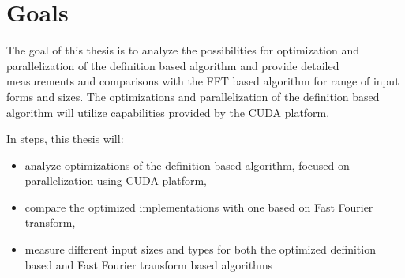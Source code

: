 \section*{Goals}
The goal of this thesis is to analyze the possibilities for optimization and parallelization of the definition based algorithm and provide detailed measurements and comparisons with the FFT based algorithm for range of input forms and sizes. The optimizations and parallelization of the definition based algorithm will utilize capabilities provided by the CUDA platform.

In steps, this thesis will:
\begin{itemize}
	\item analyze optimizations of the definition based algorithm, focused on parallelization using CUDA platform,
	\item compare the optimized implementations with one based on Fast Fourier transform,
	\item measure different input sizes and types for both the optimized definition based and Fast Fourier transform based algorithms
\end{itemize}


